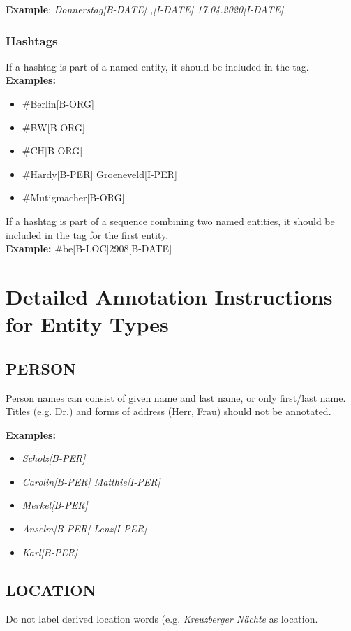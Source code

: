 \noindent\textbf{Example}: \textit{Donnerstag[B-DATE] ,[I-DATE] 17.04.2020[I-DATE]}

\subsubsection*{Hashtags}
If a hashtag is part of a named entity, it should be included in the tag.\\

\noindent\textbf{Examples:}
\begin{itemize}
	\item \#Berlin[B-ORG]
	\item \#BW[B-ORG]
	\item \#CH[B-ORG]
	\item \#Hardy[B-PER] Groeneveld[I-PER]
	\item \#Mutigmacher[B-ORG]
\end{itemize}

\noindent If a hashtag is part of a sequence combining two named entities, it should be included in the tag for the first entity.\\

\textbf{Example:} \#be[B-LOC]2908[B-DATE]
	
\section*{Detailed Annotation Instructions for Entity Types}

\subsection*{PERSON}
Person names can consist of given name and last name, or only first/last name. Titles (e.g. Dr.) and forms of address (Herr, Frau) should not be annotated.  

\noindent\textbf{Examples:}
\begin{itemize}
	\item \textit{Scholz[B-PER]}
	\item \textit{Carolin[B-PER] Matthie[I-PER]}
	\item \textit{Merkel[B-PER]}
	\item \textit{Anselm[B-PER] Lenz[I-PER]}
	\item \textit{Karl[B-PER]}
\end{itemize}

\subsection*{LOCATION}
Do not label derived location words (e.g. \textit{Kreuzberger Nächte} as location. 

